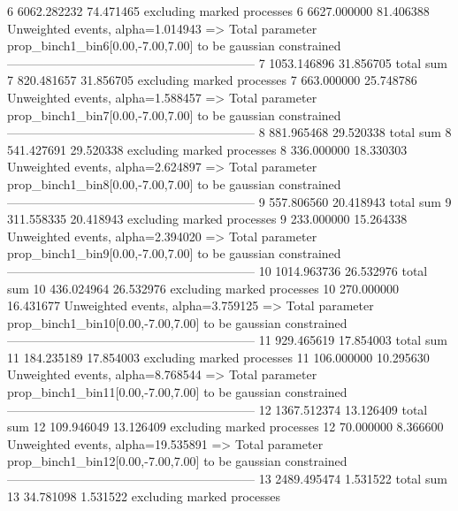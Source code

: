 6          6062.282232     74.471465       excluding marked processes    
6          6627.000000     81.406388       Unweighted events, alpha=1.014943
  => Total parameter prop_binch1_bin6[0.00,-7.00,7.00] to be gaussian constrained
------------------------------------------------------------
7          1053.146896     31.856705       total sum                     
7          820.481657      31.856705       excluding marked processes    
7          663.000000      25.748786       Unweighted events, alpha=1.588457
  => Total parameter prop_binch1_bin7[0.00,-7.00,7.00] to be gaussian constrained
------------------------------------------------------------
8          881.965468      29.520338       total sum                     
8          541.427691      29.520338       excluding marked processes    
8          336.000000      18.330303       Unweighted events, alpha=2.624897
  => Total parameter prop_binch1_bin8[0.00,-7.00,7.00] to be gaussian constrained
------------------------------------------------------------
9          557.806560      20.418943       total sum                     
9          311.558335      20.418943       excluding marked processes    
9          233.000000      15.264338       Unweighted events, alpha=2.394020
  => Total parameter prop_binch1_bin9[0.00,-7.00,7.00] to be gaussian constrained
------------------------------------------------------------
10         1014.963736     26.532976       total sum                     
10         436.024964      26.532976       excluding marked processes    
10         270.000000      16.431677       Unweighted events, alpha=3.759125
  => Total parameter prop_binch1_bin10[0.00,-7.00,7.00] to be gaussian constrained
------------------------------------------------------------
11         929.465619      17.854003       total sum                     
11         184.235189      17.854003       excluding marked processes    
11         106.000000      10.295630       Unweighted events, alpha=8.768544
  => Total parameter prop_binch1_bin11[0.00,-7.00,7.00] to be gaussian constrained
------------------------------------------------------------
12         1367.512374     13.126409       total sum                     
12         109.946049      13.126409       excluding marked processes    
12         70.000000       8.366600        Unweighted events, alpha=19.535891
  => Total parameter prop_binch1_bin12[0.00,-7.00,7.00] to be gaussian constrained
------------------------------------------------------------
13         2489.495474     1.531522        total sum                     
13         34.781098       1.531522        excluding marked processes    
